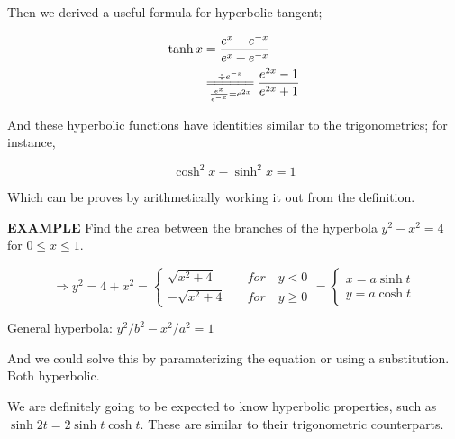 \documentclass{article}
\begin{document}
\vspace{10pt}

Then we derived a useful formula for hyperbolic tangent;

\begin{align*}
\tanh x&=\frac{e^x-e^{-x}}{e^x+e^{-x}}\\
&\overset{\div e^{-x}}{\underset{\frac{e^x}{e^{-x}}=e^{2x}}{=\joinrel=\joinrel=\joinrel=\joinrel=\joinrel=}}\frac{e^{2x}-1}{e^{2x}+1}
\end{align*}

\vspace{10pt}

And these hyperbolic functions have identities similar to the trigonometrics; for instance,

\[\cosh^2x-\sinh^2x=1\]

\vspace{10pt}

Which can be proves by arithmetically working it out from the definition.


\newpage

{\bf{}EXAMPLE} Find the area between the branches of the hyperbola $y^2-x^2=4$ for $0\leq x\leq1$.

\[\Rightarrow y^2=4+x^2=\left\{\begin{aligned}\sqrt{x^2+4}&\quad for\quad y<0\\-\sqrt{x^2+4}&\quad for\quad y\geq0\end{aligned}\right.=\left\{\begin{aligned}x=a\sinh t\\y=a\cosh t\end{aligned}\right.\]

General hyperbola: $y^2/b^2-x^2/a^2=1$

\begin{center}
\end{center}


And we could solve this by paramaterizing the equation or using a substitution. Both hyperbolic.

\vspace{10pt}

We are definitely going to be expected to know hyperbolic properties, such as $\sinh2t=2\sinh t\cosh t$. These are similar to their trigonometric counterparts.
\end{document}
